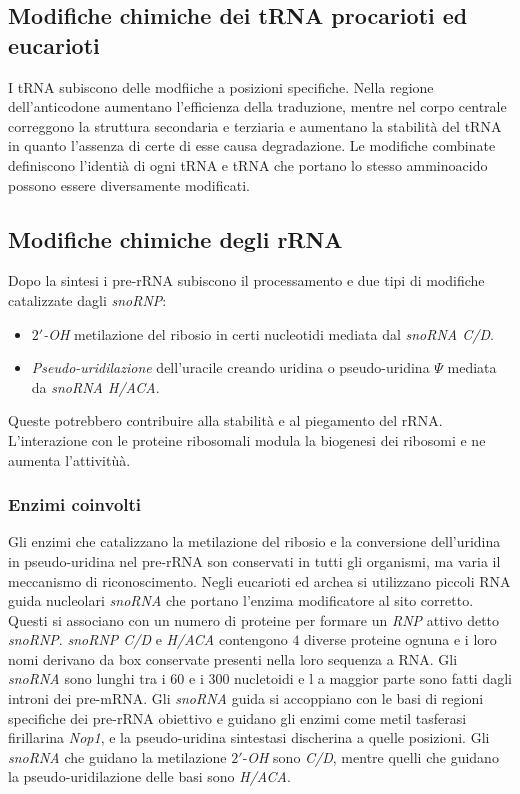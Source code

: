 \subsection{Modifiche chimiche dei tRNA procarioti ed eucarioti}
I tRNA subiscono delle modfiiche a posizioni specifiche. Nella regione dell'anticodone aumentano l'efficienza della traduzione, mentre nel corpo centrale correggono la struttura 
secondaria e terziaria e aumentano la stabilit\`a del tRNA in quanto l'assenza di certe di esse causa degradazione. Le modifiche combinate definiscono l'identi\`a di ogni tRNA e 
tRNA che portano lo stesso amminoacido possono essere diversamente modificati. 
\subsection{Modifiche chimiche degli rRNA}
Dopo la sintesi i pre-rRNA subiscono il processamento e due tipi di modifiche catalizzate dagli \emph{snoRNP}:
\begin{itemize}
	\item \emph{$2'$-OH} metilazione del ribosio in certi nucleotidi mediata dal \emph{snoRNA C/D}.
	\item \emph{Pseudo-uridilazione} dell'uracile creando uridina o pseudo-uridina $\Psi$ mediata da \emph{snoRNA H/ACA}.
\end{itemize}
Queste potrebbero contribuire alla stabilit\`a e al piegamento del rRNA. L'interazione con le proteine ribosomali  modula la biogenesi dei ribosomi e ne aumenta l'attivitù\`a. 
\subsubsection{Enzimi coinvolti}
Gli enzimi che catalizzano la metilazione del ribosio e la conversione dell'uridina in pseudo-uridina nel pre-rRNA son conservati in tutti gli organismi, ma varia il meccanismo di 
riconoscimento. Negli eucarioti ed archea si utilizzano piccoli RNA guida nucleolari \emph{snoRNA} che portano l'enzima modificatore al sito corretto. Questi si associano con un numero
di proteine per formare un \emph{RNP} attivo detto \emph{snoRNP}. \emph{snoRNP C/D} e \emph{H/ACA} contengono $4$ diverse proteine ognuna e i loro nomi derivano da box conservate 
presenti nella loro sequenza a RNA. Gli \emph{snoRNA} sono lunghi tra i $60$ e i $300$ nucletoidi e l a maggior parte sono fatti dagli introni dei pre-mRNA. Gli \emph{snoRNA} guida si 
accoppiano con le basi di regioni specifiche dei pre-rRNA obiettivo e guidano gli enzimi come metil tasferasi firillarina \emph{Nop1}, e la pseudo-uridina sintestasi discherina a quelle
posizioni. Gli \emph{snoRNA} che guidano la metilazione $2'$-\emph{OH} sono \emph{C/D}, mentre quelli che guidano la pseudo-uridilazione delle basi sono \emph{H/ACA}. 
